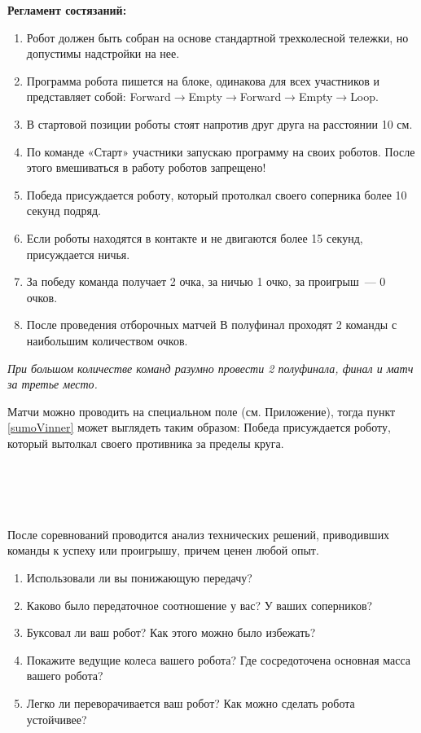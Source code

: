 {\bfseries Регламент состязаний:}
\begin{enumerate}
	\item Робот должен быть собран на основе стандартной трехколесной тележки, но допустимы надстройки на нее.
	\item Программа робота пишется на блоке, одинакова для всех участников и представляет собой: Forward\(\to\)Empty\(\to\)Forward\(\to\)Empty\(\to\)Loop.
	\item В стартовой позиции роботы стоят напротив друг друга на расстоянии 10 см.
	\item По команде «Старт» участники запускаю программу на своих роботов. После этого вмешиваться в работу роботов запрещено!
	\item \label{sumoVinner}Победа присуждается роботу, который протолкал своего соперника более 10 секунд подряд.
	\item Если роботы находятся в контакте и не двигаются более 15 секунд, присуждается ничья.
	\item За победу команда получает 2 очка, за ничью 1 очко, за проигрыш~--- 0 очков.
	\item После проведения отборочных матчей В полуфинал проходят 2 команды с наибольшим количеством очков.
\end{enumerate}

{\slshape При большом количестве команд разумно провести 2 полуфинала, финал и матч за третье место.
	
	Матчи можно проводить на специальном поле (см. Приложение), тогда пункт \ref{sumoVinner} может выглядеть таким образом:  Победа присуждается роботу, который вытолкал своего противника за пределы круга.}\\\\

{\hypertarget{lesson8x3}{}}\\\\	

После соревнований проводится анализ технических решений, приводивших команды к успеху или проигрышу, причем ценен любой опыт.
\begin{enumerate}
	\item Использовали ли вы понижающую передачу?
	\item Каково было передаточное соотношение у вас? У ваших соперников? 
	\item Буксовал ли ваш робот? Как этого можно было избежать?
	\item Покажите ведущие колеса вашего робота? Где сосредоточена основная масса вашего робота?
	\item Легко ли переворачивается ваш робот? Как можно сделать робота устойчивее?
\end{enumerate}

